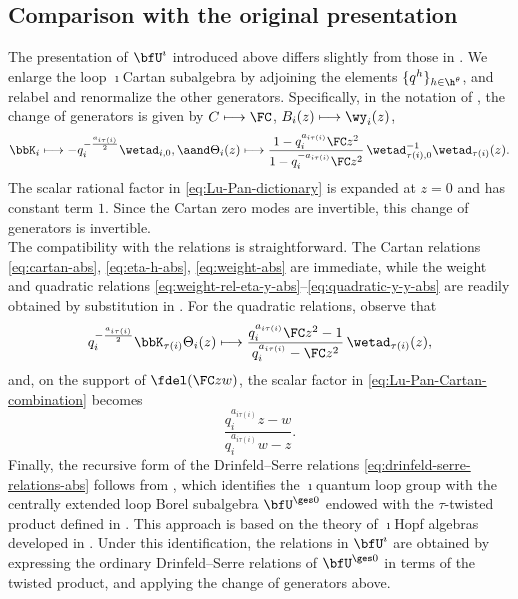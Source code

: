 \documentclass[reqno]{amsart}
\numberwithin{equation}{section}
\begin{document}
\subsection{Comparison with the original presentation}
\label{ss:Lu-Pan-presentation}
The presentation of $\bfU^\imath$ introduced above differs slightly
from those in \cite{lu-wang-weekes-26, lu-pan-26}.
We enlarge the loop $\imath$Cartan subalgebra by adjoining the elements
$\{q^h\}_{h\in\h^{\theta}}$, and relabel and renormalize the other generators.
Specifically, in the notation of
\cite[Def.~2.11, Sec.~4.3]{lu-pan-26}, the change of generators is
given by $C\longmapsto\FC$, $B_i(z)\longmapsto\wy_i(z)$, 
\begin{equation}\label{eq:Lu-Pan-dictionary}
\bbK_i\longmapsto-q_i^{-\frac{a_{i\tau(i)}}{2}}\wetad_{i,0},
\aand
\Theta_i(z)\longmapsto
\frac{1-q_i^{a_{i\tau(i)}}\FC z^2}
{1-q_i^{-a_{i\tau(i)}}\FC z^2}\,
\wetad_{\tau(i),0}^{-1}\wetad_{\tau(i)}(z).
\end{equation}
The scalar rational factor in \eqref{eq:Lu-Pan-dictionary}
is expanded at $z=0$ and has constant term $1$.
Since the Cartan zero modes are invertible, this change of
generators is invertible.\\

The compatibility with the relations is straightforward.
The Cartan relations \eqref{eq:cartan-abs}, \eqref{eq:eta-h-abs}, \eqref{eq:weight-abs} are immediate, while the weight and quadratic relations
\eqref{eq:weight-rel-eta-y-abs}--\eqref{eq:quadratic-y-y-abs} are readily 
obtained by substitution in \cite[Eqs.~(2.44)--(2.46)]{lu-pan-26}.
For the quadratic relations, observe that
\begin{equation}\label{eq:Lu-Pan-Cartan-combination}
q_i^{-\frac{a_{i\tau(i)}}{2}}\bbK_{\tau(i)}\Theta_i(z)
\longmapsto
\frac{q_i^{a_{i\tau(i)}}\FC z^2-1}
{q_i^{a_{i\tau(i)}}-\FC z^2}\,
\wetad_{\tau(i)}(z),
\end{equation}
and, on the support of $\fdel(\FC zw)$, the scalar factor in
\eqref{eq:Lu-Pan-Cartan-combination} becomes
\[
\frac{q_i^{a_{i\tau(i)}}z-w}
{q_i^{a_{i\tau(i)}}w-z}.
\]
Finally, the recursive form of the Drinfeld--Serre relations
\eqref{eq:drinfeld-serre-relations-abs} follows from \cite[Thm.~4.7]{lu-pan-26}, which identifies the $\imath$quantum loop group with the centrally extended loop Borel subalgebra $\bfU^{\ges0}$ endowed with the $\tau$-twisted product defined in \cite[Eq.~(4.36)]{lu-pan-26}. This approach is based on the theory of $\imath$Hopf algebras developed in \cite{chen-pan-ruan-wang-25}. Under this identification, the relations in $\bfU^\imath$ are obtained by expressing the ordinary Drinfeld--Serre relations of $\bfU^{\ges0}$ in terms of the twisted product, and applying the change of generators above.
\end{document}
